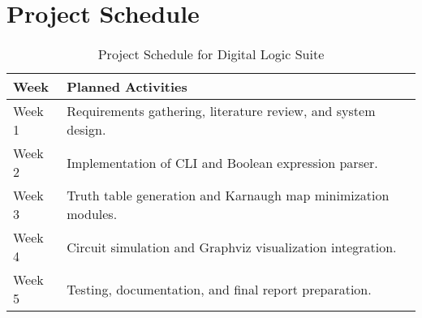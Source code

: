 \section{Project Schedule}
\begin{table}[ht!]
    \centering
    \begin{tabular}{|>{\raggedright}p{2cm}|p{10cm}|}
        \hline
        \textbf{Week} & \textbf{Planned Activities}                                   \\
        \hline
        Week 1        & Requirements gathering, literature review, and system design. \\
        \hline
        Week 2        & Implementation of CLI and Boolean expression parser.          \\
        \hline
        Week 3        & Truth table generation and Karnaugh map minimization modules. \\
        \hline
        Week 4        & Circuit simulation and Graphviz visualization integration.    \\
        \hline
        Week 5        & Testing, documentation, and final report preparation.         \\
        \hline
    \end{tabular}
    \caption{Project Schedule for Digital Logic Suite}
\end{table}